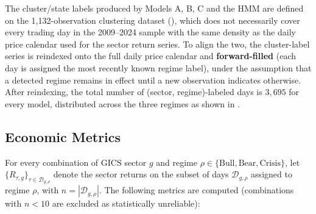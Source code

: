 The cluster/state labels produced by Models A, B, C and the HMM are
defined on the 1{,}132-observation clustering dataset
(), which does not necessarily cover every trading
day in the 2009--2024 sample with the same density as the daily price
calendar used for the sector return series. To align the two, the
cluster-label series is reindexed onto the full daily price calendar and
\textbf{forward-filled} (each day is assigned the most recently known
regime label), under the assumption that a detected regime remains in
effect until a new observation indicates otherwise. After reindexing, the
total number of (sector, regime)-labeled days is $3{,}695$ for every
model, distributed across the three regimes as shown in
.

\subsection{Economic Metrics}

For every combination of GICS sector $g$ and regime $\rho \in
\{\text{Bull}, \text{Bear}, \text{Crisis}\}$, let
$\{R_{\tau,g}\}_{\tau \in \mathcal{D}_{g,\rho}}$ denote the sector returns
on the subset of days $\mathcal{D}_{g,\rho}$ assigned to regime $\rho$,
with $n = |\mathcal{D}_{g,\rho}|$. The following metrics are computed
(combinations with $n < 10$ are excluded as statistically unreliable):

